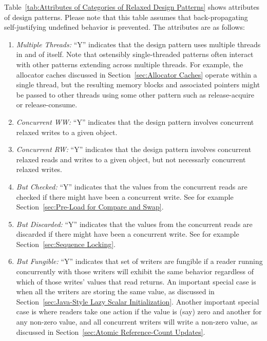 \documentclass[10]{article}
\begin{document}
Table~\ref{tab:Attributes of Categories of Relaxed Design Patterns}
shows attributes of design patterns.
Please note that this table assumes that back-propagating self-justifying
undefined behavior is prevented.
The attributes are as follows:

\begin{enumerate}
\item	\emph{Multiple Threads:}  ``Y'' indicates that the design pattern
	uses multiple threads in and of itself.
	Note that ostensibly single-threaded patterns often interact
	with other patterns extending across multiple threads.
	For example, the allocator caches discussed in
	Section~\ref{sec:Allocator Caches}
	operate within a single thread, but the resulting memory blocks
	and associated pointers might be passed to other threads using
	some other pattern such as release-acquire or release-consume.
\item	\emph{Concurrent WW:}  ``Y'' indicates that the design pattern
	involves concurrent relaxed writes to a given object.
\item	\emph{Concurrent RW:}  ``Y'' indicates that the design pattern
	involves concurrent relaxed reads and writes to a given object,
	but not necessarly concurrent relaxed writes.
\item	\emph{But Checked:}  ``Y'' indicates that the values from
	the concurrent reads are checked if there might have been a
	concurrent write.  See for example
	Section~\ref{sec:Pre-Load for Compare and Swap}.
\item	\emph{But Discarded:}  ``Y'' indicates that the values from
	the concurrent reads are discarded if there might have been a
	concurrent write.
	See for example Section~\ref{sec:Sequence Locking}.
\item	\emph{But Fungible:}  ``Y'' indicates that set of writers are
	fungible if a reader running concurrently with those writers will
	exhibit the same behavior regardless of which of those writes'
	values that read returns.
	An important special case is when all the writers are storing
	the same value, as discussed in
	Section~\ref{sec:Java-Style Lazy Scalar Initialization}.
	Another important special case is where readers take one
	action if the value is (say) zero and another for any
	non-zero value, and all concurrent writers will write
	a non-zero value, as discussed in
	Section~\ref{sec:Atomic Reference-Count Updates}.


\end{enumerate}
\end{document}
